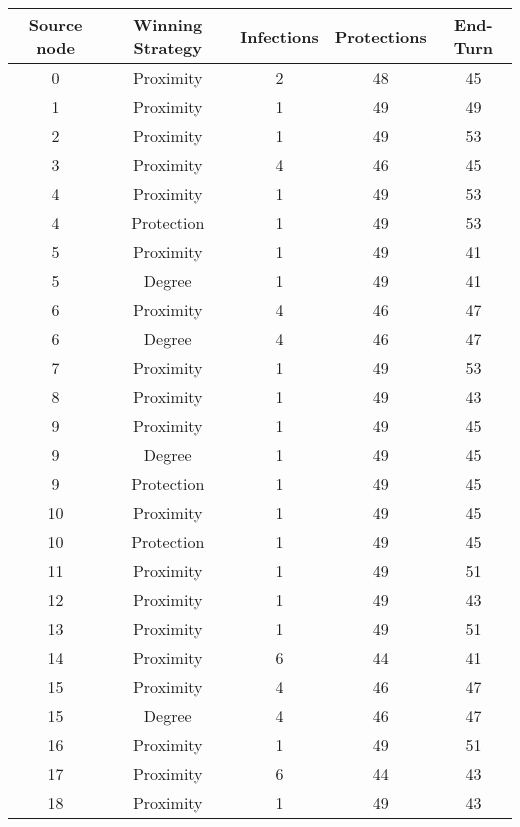 \documentclass[results.tex]{subfiles}
\begin{document}
\begin{center}
  \begin{tabular}{| c || c | c | c | c |}
    \hline
    {\bfseries Source node} & {\bfseries Winning Strategy} & {\bfseries Infections} & {\bfseries Protections} & {\bfseries End-Turn} \\  %
    \hline\hline
    0 & Proximity & 2 & 48 & 45 \\ 
    \hline
    1 & Proximity & 1 & 49 & 49 \\ 
    \hline
    2 & Proximity & 1 & 49 & 53 \\ 
    \hline
    3 & Proximity & 4 & 46 & 45 \\ 
    \hline
    4 & Proximity & 1 & 49 & 53 \\ 
    \hline
    4 & Protection & 1 & 49 & 53 \\ 
    \hline
    5 & Proximity & 1 & 49 & 41 \\ 
    \hline
    5 & Degree & 1 & 49 & 41 \\ 
    \hline
    6 & Proximity & 4 & 46 & 47 \\ 
    \hline
    6 & Degree & 4 & 46 & 47 \\ 
    \hline
    7 & Proximity & 1 & 49 & 53 \\ 
    \hline
    8 & Proximity & 1 & 49 & 43 \\ 
    \hline
    9 & Proximity & 1 & 49 & 45 \\ 
    \hline
    9 & Degree & 1 & 49 & 45 \\ 
    \hline
    9 & Protection & 1 & 49 & 45 \\ 
    \hline
    10 & Proximity & 1 & 49 & 45 \\ 
    \hline
    10 & Protection & 1 & 49 & 45 \\ 
    \hline
    11 & Proximity & 1 & 49 & 51 \\ 
    \hline
    12 & Proximity & 1 & 49 & 43 \\ 
    \hline
    13 & Proximity & 1 & 49 & 51 \\ 
    \hline
    14 & Proximity & 6 & 44 & 41 \\ 
    \hline
    15 & Proximity & 4 & 46 & 47 \\ 
    \hline
    15 & Degree & 4 & 46 & 47 \\ 
    \hline
    16 & Proximity & 1 & 49 & 51 \\ 
    \hline
    17 & Proximity & 6 & 44 & 43 \\ 
    \hline
    18 & Proximity & 1 & 49 & 43 \\ 

\end{tabular}
\end{center}
\end{document}
